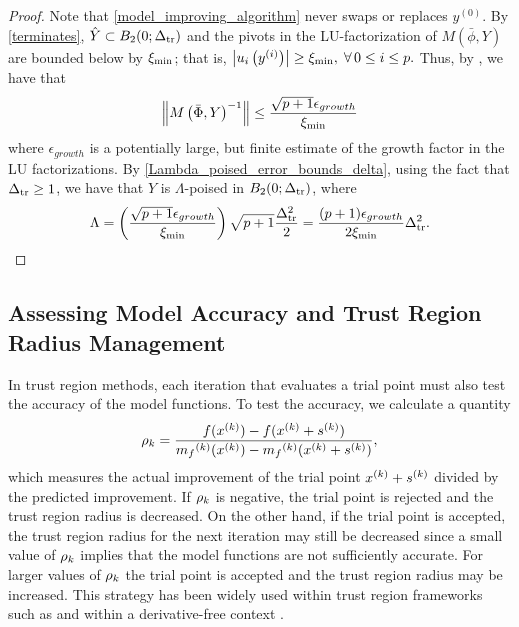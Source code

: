 \documentclass{article}
\begin{document}
\begin{proof}

Note that \cref{model_improving_algorithm} never swaps or replaces $y^{(0)}$.
By \cref{terminates},  $\hat Y \subset B_2(0;\Delta_{\textrm{tr}})$
and the pivots in the LU-factorization of $M(\bar{\phi},Y)$ are bounded below by $\xi_{\text{min}}$; that is,
$\left|u_i\left(y^{(i)}\right)\right| \ge \xi_{\text{min}}, \; \forall \,0 \le i \le p.$
Thus, by 
\cite[Section 6.7, Exercise 3]{introduction_book}, 
 we have that 
\begin{align*}
\left\|M\left(\bar \Phi, Y\right)^{-1}\right\| \le \frac{\sqrt{p+1}\epsilon_{growth}}{\xi_{\text{min}}}
\end{align*}
where $\epsilon_{growth}$ is a potentially large, but finite estimate of the growth factor in the LU factorizations.   By  \cref{Lambda_poised_error_bounds_delta},  using the fact that $\Delta_{\textrm{tr}} \ge 1$, we have that $Y$ is $\Lambda$-poised in $B_2(0;\Delta_{\textrm{tr}})$,  where
\[\Lambda = \left(\frac{\sqrt{p+1}\epsilon_{growth}}{\xi_{\text{min}}}\right) \sqrt{p+1}  \frac{\Delta_{\textrm{tr}}^2}{2} = \frac{(p+1) \epsilon_{growth}}{2\xi_{\text{min}}}\Delta_{\textrm{tr}}^2.\]

\end{proof}



\subsection{Assessing Model Accuracy and Trust Region Radius Management}

\label{rhosection}

In trust region methods, each iteration that evaluates a trial point must also test the accuracy of the model functions.
To test the accuracy, we calculate a quantity
\begin{align}
\label{define_rhok}
\rho_k = \frac{f(x^{(k)}) - f(x^{(k)}+{{s}^{(k)}})}{{{m}_f}^{(k)}(x^{(k)}) - {{m}_f}^{(k)}(x^{(k)}+{{s}^{(k)}})},
\end{align}
which measures the actual improvement of the trial point $x^{(k)}+{{s}^{(k)}}$ divided by the predicted improvement.  If $\rho_k$ is negative, the trial point is rejected and the trust region radius is decreased.   On the other hand, if the trial point is accepted, the trust region radius for the next iteration may still be decreased since 
a small value of $\rho_k$ implies that the model functions are not sufficiently accurate.   For larger values of $\rho_k$ the trial point is accepted and the trust region radius may be increased.
This strategy has been widely used within trust region frameworks such as \cite{Conn:2000:TM:357813} and within a derivative-free context \cite{introduction_book}.
\end{document}
